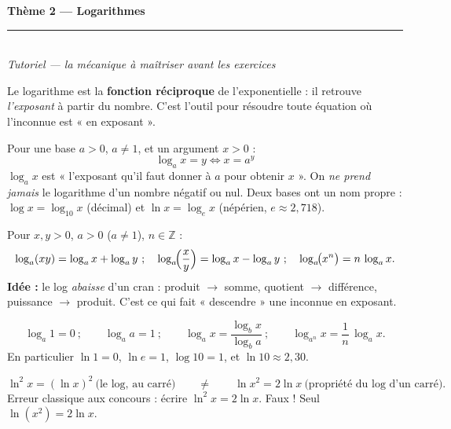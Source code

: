 \documentclass[11pt,a4paper]{article}
\newcommand{\Z}{\mathbb{Z}}
\begin{document}
\begin{center}
{\LARGE\bfseries\color{primarydark} Thème 2 — Logarithmes}\\[2pt]
{\color{primary}\rule{0.5\textwidth}{1.2pt}}\\[4pt]
{\small\itshape Tutoriel — la mécanique à maîtriser avant les exercices}
\end{center}

\vspace{2mm}
\noindent Le logarithme est la \textbf{fonction réciproque} de l'exponentielle : il retrouve
\emph{l'exposant} à partir du nombre. C'est l'outil pour résoudre toute équation où l'inconnue est
« en exposant ».

\begin{cle}
Pour une base $a>0$, $a\neq1$, et un argument $x>0$ :
\[ \boxed{\ \log_a x = y \iff x=a^{y}\ } \]
$\log_a x$ est « l'exposant qu'il faut donner à $a$ pour obtenir $x$ ». On \emph{ne prend jamais} le
logarithme d'un nombre négatif ou nul. Deux bases ont un nom propre :
$\log x=\log_{10}x$ (décimal) et $\ln x=\log_e x$ (népérien, $e\approx2{,}718$).
\end{cle}

\begin{cle}
Pour $x,y>0$, $a>0$ ($a\neq1$), $n\in\Z$ :
\[ \log_a(xy)=\log_a x+\log_a y\ ;\quad
   \log_a\!\Bigl(\frac{x}{y}\Bigr)=\log_a x-\log_a y\ ;\quad
   \log_a\!\bigl(x^{n}\bigr)=n\,\log_a x. \]
\textbf{Idée :} le log \emph{abaisse} d'un cran : produit $\to$ somme, quotient $\to$ différence,
puissance $\to$ produit. C'est ce qui fait « descendre » une inconnue en exposant.
\end{cle}

\begin{cle}
\[ \log_a 1=0\ ;\qquad \log_a a=1\ ;\qquad
   \log_a x=\frac{\log_b x}{\log_b a}\ ;\qquad \log_{a^{n}} x=\frac1n\,\log_a x. \]
En particulier $\ln 1=0$, $\ln e=1$, $\log 10=1$, et $\ln 10\approx 2{,}30$.
\end{cle}

\begin{piege}
\[ \ln^{2}x=(\ln x)^{2}\ \text{(le log, au carré)}\qquad\neq\qquad \ln x^{2}=2\ln x\ \text{(propriété du log d'un carré)}. \]
Erreur classique aux concours : écrire $\ln^{2}x=2\ln x$. Faux ! Seul $\ln(x^{2})=2\ln x$.
\end{piege}
\end{document}
